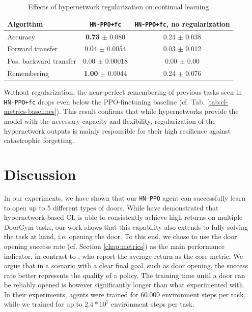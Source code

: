 \documentclass[dvipsnames]{article} %
\newcommand{\comment}[1]{}
\newcommand{\as}[1] {\comment{{\color{orange} AS: #1}}}              %
\begin{document}
\begin{table}[tb]
\caption{Effects of hypernetwork regularization on continual learning}
\label{tab:ablation-results}
\begin{center}
\begin{tabular}{@{}lcc@{}}
\toprule
Algorithm & \texttt{HN-PPO+fc} & \texttt{HN-PPO+fc}, no regularization \\ 
\midrule
Accuracy               &  \textbf{0.73} $\pm$ 0.080 & 0.24 $\pm$ 0.038\\
Forward transfer       &  0.04 $\pm$ 0.0054 & 0.03 $\pm$ 0.012\\
Pos. backward transfer &  0.00 $\pm$ 0.00018& 0.00 $\pm$ 0.00\\
Remembering            &  \textbf{1.00} $\pm$ 0.0044& 0.24 $\pm$ 0.076\\
\bottomrule
\end{tabular}
\end{center}
\end{table}

Without regularization, the near-perfect remembering of previous tasks seen in \texttt{HN-PPO+fc} drops even below the PPO-finetuning baseline (cf. Tab. \ref{tab:cl-metrics-baselines}). This result confirms that while hypernetworks provide the model with the necessary capacity and flexibility, regularization of the hypernetwork outputs is mainly responsible for their high resilience against catastrophic forgetting.

\section{Discussion}
\as{Start with summarizing what you did, this paragraph comes as too abrupt.} 
In our experiments, we have shown that our \texttt{HN-PPO} agent can successfully learn to open up to 5 different types of doors. While \citet{MBRLHypernetworks} have demonstrated that hypernetwork-based CL is able to consistently achieve high returns on multiple DoorGym tasks, our work shows that this capability also extends to fully solving the task at hand, i.e. opening the door. To this end, we chose to use the door opening success rate (cf. Section \ref{chap:metrics}) as the main performance indicator, in contrast to \citet{MBRLHypernetworks}, who report the average return as the core metric. We argue that in a scenario with a clear final goal, such as door opening, the success rate better represents the quality of a policy. The training time until a door can be reliably opened is however significantly longer than what \citet{MBRLHypernetworks} experimented with. In their experiments, agents were trained for 60.000 environment steps per task, while we trained for up to $2.4*10^7$ environment steps per task. 
\end{document}
